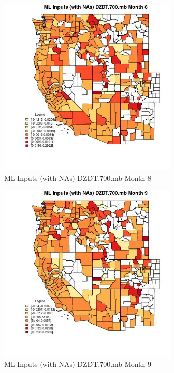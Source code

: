 \begin{figure} 
\centering  
\includegraphics[width=0.77\textwidth]{Code_Outputs/Report_ML_input_PM25_Step4_part_f_de_duplicated_aves_prioritize_24hr_obswNAs_CountyDZDT700mbmedianMonth8.jpg} 
\caption{\label{fig:Report_ML_input_PM25_Step4_part_f_de_duplicated_aves_prioritize_24hr_obswNAsCountyDZDT700mbmedianMonth8}ML Inputs (with NAs) DZDT.700.mb Month 8} 
\end{figure} 
 

\begin{figure} 
\centering  
\includegraphics[width=0.77\textwidth]{Code_Outputs/Report_ML_input_PM25_Step4_part_f_de_duplicated_aves_prioritize_24hr_obswNAs_CountyDZDT700mbmedianMonth9.jpg} 
\caption{\label{fig:Report_ML_input_PM25_Step4_part_f_de_duplicated_aves_prioritize_24hr_obswNAsCountyDZDT700mbmedianMonth9}ML Inputs (with NAs) DZDT.700.mb Month 9} 
\end{figure} 
 

